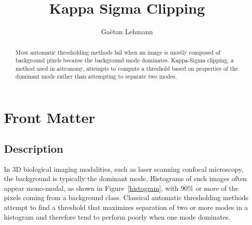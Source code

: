 \documentclass{InsightArticle}
\title{Kappa Sigma Clipping}
\author{Ga\"etan Lehmann}
\begin{document}
\maketitle

\ifhtml
\chapter*{Front Matter\label{front}}
\fi


\begin{abstract}
\noindent

Most automatic thresholding methods fail when an image is mostly
composed of background pixels because the background mode
dominates. Kappa-Sigma clipping, a method used in astronomy, attempts
to compute a threshold based on properties of the dominant mode
rather than attempting to separate two modes.
\end{abstract}


\section{Description}

In 3D biological imaging modalities, such as laser scanning confocal
microscopy, the background is typically the dominant mode. Histograms
of such images often appear mono-modal, as shown in
Figure~\ref{histogram}, with 90\% or more of the pixels coming from a
background class. Classical automatic thresholding methods attempt to
find a threshold that maximizes separation of two or more modes in a
histogram and therefore tend to perform poorly when one mode
dominates.
\end{document}
